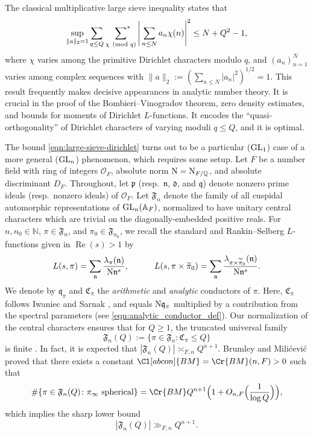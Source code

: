 \documentclass[11pt]{amsart}
\theoremstyle{remark}
\numberwithin{equation}{section}
\newcommand{\kd}{\mathfrak{d}}
\newcommand{\kp}{\mathfrak{p}}
\newcommand{\n}{\mathfrak{n}}
\newcommand{\kn}{\mathfrak{n}}
\newcommand{\kq}{\mathfrak{q}}
\newcommand{\F}{\mathfrak{F}}
\newcommand{\N}{\textnormal{N}}
\newcommand{\Q}{\mathbb{Q}}
\newcommand{\A}{\mathbb{A}}
\renewcommand{\Re}{\textnormal{Re}}
\newcommand{\GL}{\textnormal{GL}}
\renewcommand{\tilde}{\widetilde}
\renewcommand{\pmod}[1]{\ (\textnormal{mod } #1)}
\renewcommand{\Re}{\mathop{\mathrm{Re}}}
\begin{document}
The classical multiplicative large sieve inequality \cite[Theorem 7.13]{IK} states that
\begin{equation} \label{eqn:large-sieve-dirichlet}
    \sup_{\|a\|_2 = 1} \sum_{q \le Q}~\sideset{}{^*}\sum_{\chi \pmod{q}} \Bigg| \sum_{n\leq N} a_n \chi(n) \Bigg|^2 \leq N + Q^2 - 1,
\end{equation}
where $\chi$ varies among the primitive Dirichlet characters modulo $q$, and $(a_n)_{n=1}^{N}$ varies among complex sequences with $\|a\|_2 := (\sum_{n\leq N} |a_n|^2)^{1/2} = 1$. This result frequently makes decisive appearances in analytic number theory.  It is crucial in the proof of the Bombieri--Vinogradov theorem, zero density estimates, and bounds for moments of Dirichlet $L$-functions. It encodes the ``quasi-orthogonality'' of Dirichlet characters of varying moduli $q \le Q$, and it is optimal.

The bound \eqref{eqn:large-sieve-dirichlet} turns out to be a particular ($\GL_1$) case of a more general ($\GL_n$) phenomenon, which requires some setup. Let $F$ be a number field with ring of integers $\mathcal{O}_F$, absolute norm $\N = \N_{F/\Q}$, and absolute discriminant $D_F$. Throughout, let $\kp$ (resp.\ $\kn$, $\kd$, and $\kq$) denote nonzero prime ideals (resp.\ nonzero ideals) of $\mathcal{O}_F$. Let $\F_n$ denote the family of all cuspidal automorphic representations of $\GL_n(\A_F)$, normalized to have unitary central characters which are trivial on the diagonally-embedded positive reals. For $n, n_0 \in \mathbb{N}$, $\pi \in \F_n$, and $\pi_0 \in \F_{n_0}$, we recall the standard \cite{bump1998automorphic,goldfeld2011automorphic} and Rankin--Selberg $L$-functions \cite{JPSS,moeglin1989spectre,shahidi1981certain} given in $\Re(s) > 1$ by
\[
    L(s, \pi) = \sum_\n \frac{\lambda_\pi(\n)}{\N \n^{s}}, 
    \qquad\quad 
    L(s, \pi \times \tilde{\pi}_0) = \sum_\n \frac{\lambda_{\pi \times \tilde{\pi}_0}(\n)}{\N \n^{s}}.
\]
We denote by $\kq_{\pi}$ and $\mathfrak{C}_{\pi}$ the \emph{arithmetic} and \emph{analytic} conductors of $\pi$.  Here, $\mathfrak{C}_{\pi}$ follows Iwaniec and Sarnak \cite{IS}, and equals $\N \kq_{\pi}$ multiplied by a contribution from the spectral parameters (see \eqref{eqn:analytic_conductor_def}). Our normalization of the central characters ensures that for $Q\geq 1$, the truncated universal family
\[
\mathfrak{F}_n(Q):=\{\pi\in\mathfrak{F}_n\colon \mathfrak{C}_{\pi}\leq Q\}
\]
is finite \cite[Corollary 9]{Brumley}. In fact, it is expected that $|\mathfrak{F}_n(Q)|\asymp_{F,n}Q^{n+1}$. Brumley and Mili{\'c}evi{\'c} \cite{BM} proved that there exists a constant $\Cl[abcon]{BM}=\Cr{BM}(n,F)>0$ such that
\begin{equation}
\label{eqn:BM_asymptotic}
\#\{\pi\in\mathfrak{F}_n(Q)\colon \textup{$\pi_{\infty}$ spherical}\}=\Cr{BM} Q^{n+1}\Big(1+O_{n,F}\Big(\frac{1}{\log Q}\Big)\Big),
\end{equation}
which implies the sharp lower bound
\begin{equation}
\label{eqn:BM}
    |\mathfrak{F}_n(Q)|\gg_{F,n}Q^{n+1}.
\end{equation}
\end{document}
